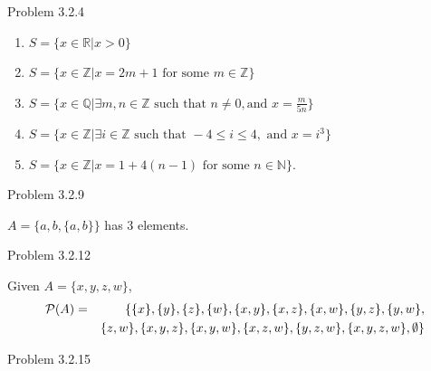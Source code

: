 \documentclass{article}
\theoremstyle{definition}
\newcommand{\R}{\mathbb{R}}
\newcommand{\Z}{\mathbb{Z}}
\newcommand{\N}{\mathbb{N}}
\newcommand{\Q}{\mathbb{Q}}
\begin{document}
	\vspace{1cm}




	\noindent Problem 3.2.4  \vspace{0.3cm}

	\begin{enumerate}
		\item $S=\{x\in\R|x>0\}$
		\item $S=\{x\in\Z|x=2m+1 \mbox{ for some } m\in\Z\}$
		\item $S=\{x\in\Q|\exists m,n\in\Z \mbox{ such that } n\not=0, \mbox{
			and } x=\frac{m}{5n}\}$
		\item $S=\{x\in\Z|\exists i\in\Z\mbox{ such that } -4\le i\le 4,
		\mbox{ and } x=i^3\}$
		\item $S=\{x\in\Z|x=1+4(n-1) \mbox{ for some } n\in\N\}$.
	\end{enumerate}

	\vspace{1cm}




	\noindent Problem 3.2.9  \vspace{0.3cm}

	$A=\{a,b,\{a,b\}\}$ has 3 elements.

	\vspace{1cm}


	\noindent Problem 3.2.12  \vspace{0.3cm}

	Given $A=\{x,y,z,w\}$,
	\begin{eqnarray}
		{\cal
		P}(A)&=&\{\{x\},\{y\},\{z\},\{w\},\{x,y\},\{x,z\},\{x,w\},\{y,z\},\{y,w\},\nonumber\\
		&
		&\{z,w\},\{x,y,z\},\{x,y,w\},\{x,z,w\},\{y,z,w\},\{x,y,z,w\},\emptyset\}\nonumber
	\end{eqnarray}
	\vspace{1cm}


	\noindent Problem 3.2.15  \vspace{0.3cm}
\end{document}
